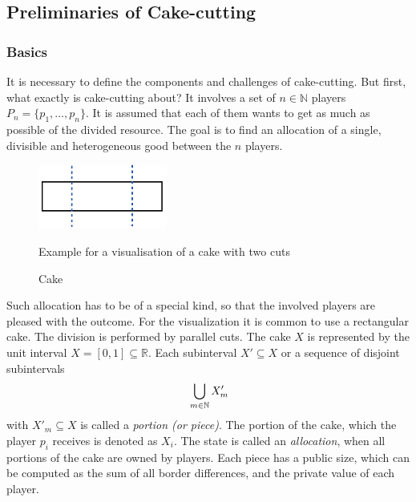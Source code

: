 \newpage
\subsection{Preliminaries of Cake-cutting}
\subsubsection{Basics}
It is necessary to define the components and challenges of cake-cutting. But first, what exactly is cake-cutting about? It involves a set of $n \in \mathbb{N}$ players $P_n=\{p_1,\ldots,p_n\}$. It is assumed that each of them wants to get as much as possible of the divided resource. The goal is to find an allocation of a single, divisible and heterogeneous good between the $n$ players.\\ 
	\begin{figure}[h]
		\centering
 		 \includegraphics[width=120pt]{kek.pdf}
   \caption{Cake}Example for a visualisation of a cake with two cuts
  	 \end{figure} 
Such allocation has to be of a special kind, so that the involved players are pleased with the outcome. For the visualization it is common to use a rectangular cake. The division is performed by parallel cuts. The cake $X$ is represented by the unit interval $X=[0,1] \subseteq \mathbb{R}$. Each subinterval $X'\subseteq X$ or a sequence of disjoint subintervals $$\sideset{}{ }\bigcup\limits_{m\in\mathbb{N}}X'_m$$
with $X'_m\subseteq X$ is called a \emph{portion (or piece)}. The portion of the cake, which the player $p_i$ receives is denoted as $X_i$. The state is called an \emph{allocation}, when all portions of the cake are owned by players. Each piece has a public size, which can be computed as the sum of all border differences, and the private value of each player.\\

